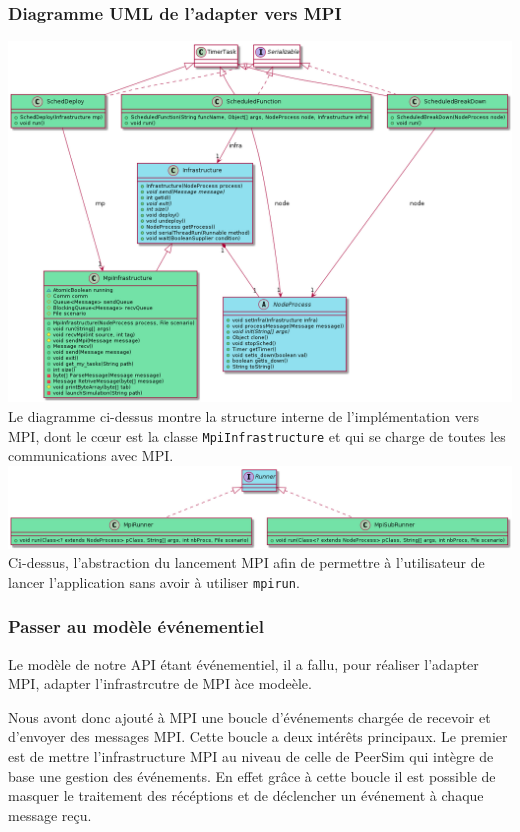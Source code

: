 \documentclass{article}
\begin{document}
				\subsubsection{Diagramme UML de l'adapter vers MPI}
				\vspace{1mm}
				\hspace*{-2.1cm} \includegraphics[width=19.5cm]{uml/mpi1.png}
				Le diagramme ci-dessus montre la structure interne de l'implémentation vers MPI, dont le cœur est la classe \verb|MpiInfrastructure|
				et qui se charge de toutes les communications avec MPI.
				\hspace*{-2.3cm} \includegraphics[width=20cm]{uml/mpi2.png}
				Ci-dessus, l'abstraction du lancement MPI afin de permettre à l'utilisateur de lancer l'application sans avoir à utiliser \verb|mpirun|.

				\subsubsection{Passer au modèle événementiel}
				Le modèle de notre API étant événementiel, il a fallu, pour réaliser l'adapter MPI,
				adapter l'infrastrcutre de MPI àce modeèle.

				Nous avont donc ajouté à MPI une boucle d'événements chargée de recevoir et
				d'envoyer des messages MPI. Cette boucle a deux intérêts principaux.
				Le premier est de mettre l'infrastructure MPI au niveau de celle de PeerSim qui
				intègre de base une gestion des événements. En effet grâce à cette boucle il est
				possible de masquer le traitement des récéptions et de déclencher un événement à
				chaque message reçu.
\end{document}
